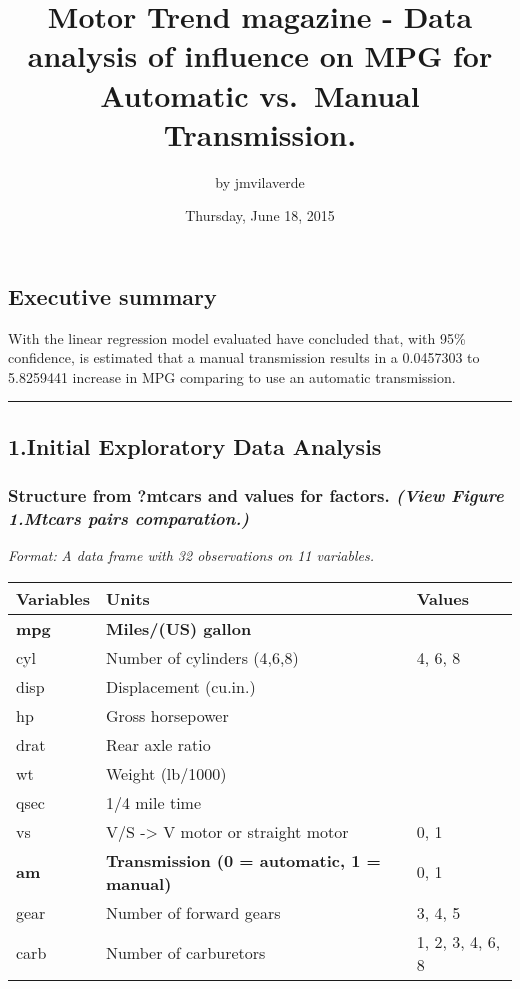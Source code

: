 \documentclass[11pt,]{article}
\title{Motor Trend magazine - Data analysis of influence on MPG for Automatic
vs.~Manual Transmission.}
\author{by jmvilaverde}
\date{Thursday, June 18, 2015}
\begin{document}
\maketitle


\subsection{Executive summary}\label{executive-summary}

With the linear regression model evaluated have concluded that, with
95\% confidence, is estimated that a manual transmission results in a
0.0457303 to 5.8259441 increase in MPG comparing to use an automatic
transmission.

\begin{center}\rule{0.5\linewidth}{\linethickness}\end{center}

\subsection{1.Initial Exploratory Data
Analysis}\label{initial-exploratory-data-analysis}

\subsubsection{\texorpdfstring{\textbf{Structure from ?mtcars and values
for factors.} \emph{(View Figure 1.Mtcars pairs
comparation.)}}{Structure from ?mtcars and values for factors. (View Figure 1.Mtcars pairs comparation.)}}\label{structure-from-mtcars-and-values-for-factors.-view-figure-1.mtcars-pairs-comparation.}

\emph{Format:} \emph{A data frame with 32 observations on 11 variables.}

\begin{longtable}[c]{@{}lll@{}}
\toprule
Variables & Units & Values\tabularnewline
\midrule
\endhead
\textbf{mpg} & \textbf{Miles/(US) gallon}\tabularnewline
cyl & Number of cylinders (4,6,8) & 4, 6, 8\tabularnewline
disp & Displacement (cu.in.)\tabularnewline
hp & Gross horsepower\tabularnewline
drat & Rear axle ratio\tabularnewline
wt & Weight (lb/1000)\tabularnewline
qsec & 1/4 mile time\tabularnewline
vs & V/S -\textgreater{} V motor or straight motor & 0, 1\tabularnewline
\textbf{am} & \textbf{Transmission (0 = automatic, 1 = manual)} & 0,
1\tabularnewline
gear & Number of forward gears & 3, 4, 5\tabularnewline
carb & Number of carburetors & 1, 2, 3, 4, 6, 8\tabularnewline
\bottomrule
\end{longtable}
\end{document}
